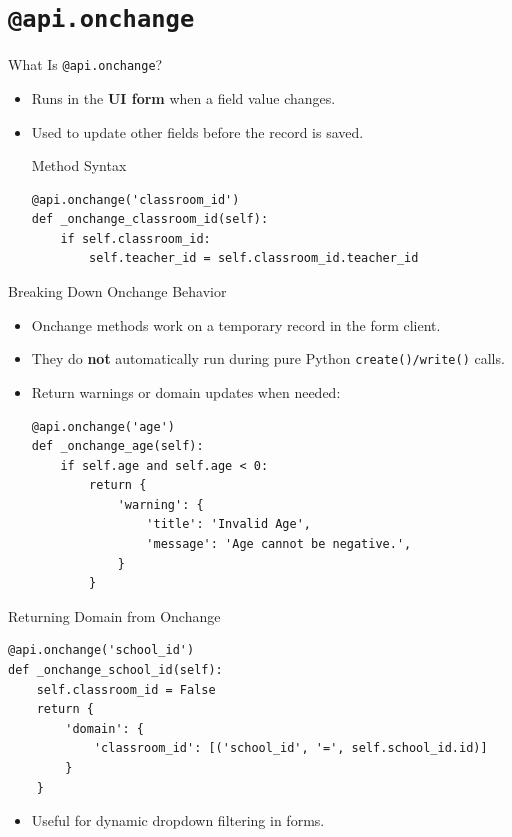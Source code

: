 \section{\texttt{@api.onchange}}

\begin{frame}[fragile]{What Is \texttt{@api.onchange}?}
	\begin{itemize}
		\item Runs in the \textbf{UI form} when a field value changes.
		\item Used to update other fields before the record is saved.
\begin{block}{Method Syntax}
\begin{lstlisting}
@api.onchange('classroom_id')
def _onchange_classroom_id(self):
	if self.classroom_id:
		self.teacher_id = self.classroom_id.teacher_id
\end{lstlisting}
\end{block}
	\end{itemize}
\end{frame}

\begin{frame}[fragile]{Breaking Down Onchange Behavior}
	\begin{itemize}
		\item Onchange methods work on a temporary record in the form client.
		\item They do \textbf{not} automatically run during pure Python \texttt{create()/write()} calls.
		\item Return warnings or domain updates when needed:
\begin{lstlisting}
@api.onchange('age')
def _onchange_age(self):
	if self.age and self.age < 0:
		return {
			'warning': {
				'title': 'Invalid Age',
				'message': 'Age cannot be negative.',
			}
		}
\end{lstlisting}
	\end{itemize}
\end{frame}

\begin{frame}[fragile]{Returning Domain from Onchange}
\begin{lstlisting}
@api.onchange('school_id')
def _onchange_school_id(self):
	self.classroom_id = False
	return {
		'domain': {
			'classroom_id': [('school_id', '=', self.school_id.id)]
		}
	}
\end{lstlisting}
	\begin{itemize}
		\item Useful for dynamic dropdown filtering in forms.
	\end{itemize}
\end{frame}

